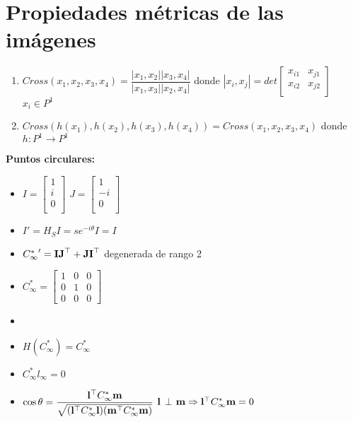 \documentclass[12pt,a4paper]{article}
\begin{document}
\section{Propiedades m\'etricas de las im\'agenes}

\begin{enumerate}
	\item $Cross(x_{1}, x_{2}, x_{3}, x_{4}) = \dfrac{|x_{1},x_{2}||x_{3},x_{4}|}{|x_{1},x_{3}||x_{2},x_{4}|}$ donde $|x_{i},x_{j}| = det \left[ {\begin{smallmatrix}
	 x_{i1} & x_{j1}\\
	 x_{i2} & x_{j2} \\
	\end{smallmatrix} } \right]$ $x_{i} \in P^{1}$

\item $Cross(h(x_{1}), h(x_{2}), h(x_{3}), h(x_{4})) = Cross(x_{1}, x_{2}, x_{3}, x_{4})$ donde $h:P^{1} \rightarrow P^{1}$
\end{enumerate}

{\bf Puntos circulares:}

\begin{itemize}
	\item $I = \left[ {\begin{smallmatrix}
	 1\\
	 i\\
	 0\\
	\end{smallmatrix} } \right]$
	$J = \left[ {\begin{smallmatrix}
	 1\\
	 -i\\
	 0\\
	\end{smallmatrix} } \right]$

	\item $I' = H_{S}I = se^{-i\theta}I = I$

	\item ${C^{*}_{\infty}}' = {\bf IJ}^{\top} + {\bf JI}^{\top}$ degenerada de rango 2

	\item $
	{C^{*}_{\infty}} =
	\left[ {\begin{smallmatrix}
	 1 & 0 & 0 \\
	 0 & 1 & 0 \\
	 0 & 0 & 0
	\end{smallmatrix} } \right]
	$

	\item %

	\item $H({C^{*}_{\infty}}) = {C^{*}_{\infty}}$

	\item ${C^{*}_{\infty}} l_{\infty} = 0$

	\item $\cos{\theta} = \dfrac{{\bf l}^{\top} {C^{*}_{\infty}} {\bf m}}
	{\sqrt{({\bf l}^{\top} {C^{*}_{\infty}} {\bf l})({\bf m}^{\top} {C^{*}_{\infty}} {\bf m}) }}$ \hspace{2cm} ${\bf l}$ $\bot$ ${\bf m} \Rightarrow {\bf l}^{\top} {C^{*}_{\infty}} {\bf m} = 0$

\end{itemize}
\end{document}
